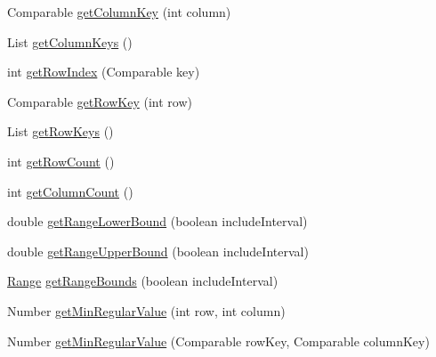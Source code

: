 \begin{DoxyCompactItemize}
\item 
Comparable \mbox{\hyperlink{classorg_1_1jfree_1_1data_1_1statistics_1_1_default_box_and_whisker_category_dataset_aac3ec96693b12a73f35a21e81a0998b9}{get\+Column\+Key}} (int column)
\item 
List \mbox{\hyperlink{classorg_1_1jfree_1_1data_1_1statistics_1_1_default_box_and_whisker_category_dataset_a0d4ff5c831a0e65c1b9658d00d04930d}{get\+Column\+Keys}} ()
\item 
int \mbox{\hyperlink{classorg_1_1jfree_1_1data_1_1statistics_1_1_default_box_and_whisker_category_dataset_a0d0e397a4efbd71661d91aed88a2fceb}{get\+Row\+Index}} (Comparable key)
\item 
Comparable \mbox{\hyperlink{classorg_1_1jfree_1_1data_1_1statistics_1_1_default_box_and_whisker_category_dataset_a7433281da93ea1c231c3d134c3c86aa9}{get\+Row\+Key}} (int row)
\item 
List \mbox{\hyperlink{classorg_1_1jfree_1_1data_1_1statistics_1_1_default_box_and_whisker_category_dataset_a9b93cea941b50fd0a0b908bfa0b1e278}{get\+Row\+Keys}} ()
\item 
int \mbox{\hyperlink{classorg_1_1jfree_1_1data_1_1statistics_1_1_default_box_and_whisker_category_dataset_ad7b6f1dc5d0b2641c579d88d0604bb7b}{get\+Row\+Count}} ()
\item 
int \mbox{\hyperlink{classorg_1_1jfree_1_1data_1_1statistics_1_1_default_box_and_whisker_category_dataset_a27063efc7e89bbf851ba362b93b20786}{get\+Column\+Count}} ()
\item 
double \mbox{\hyperlink{classorg_1_1jfree_1_1data_1_1statistics_1_1_default_box_and_whisker_category_dataset_a29a3b0a95d9a09ab05cf0063254a5025}{get\+Range\+Lower\+Bound}} (boolean include\+Interval)
\item 
double \mbox{\hyperlink{classorg_1_1jfree_1_1data_1_1statistics_1_1_default_box_and_whisker_category_dataset_a32f1be24a5e0f73dd538f73ee8c4bd40}{get\+Range\+Upper\+Bound}} (boolean include\+Interval)
\item 
\mbox{\hyperlink{classorg_1_1jfree_1_1data_1_1_range}{Range}} \mbox{\hyperlink{classorg_1_1jfree_1_1data_1_1statistics_1_1_default_box_and_whisker_category_dataset_a52f3bf900ae6f640a115f6872e702f01}{get\+Range\+Bounds}} (boolean include\+Interval)
\item 
Number \mbox{\hyperlink{classorg_1_1jfree_1_1data_1_1statistics_1_1_default_box_and_whisker_category_dataset_ae66a77a0c419365ccc8c3696c05d00e3}{get\+Min\+Regular\+Value}} (int row, int column)
\item 
Number \mbox{\hyperlink{classorg_1_1jfree_1_1data_1_1statistics_1_1_default_box_and_whisker_category_dataset_a8280fd48bbb2161d62cf90473f46eac8}{get\+Min\+Regular\+Value}} (Comparable row\+Key, Comparable column\+Key)

\end{DoxyCompactItemize}
